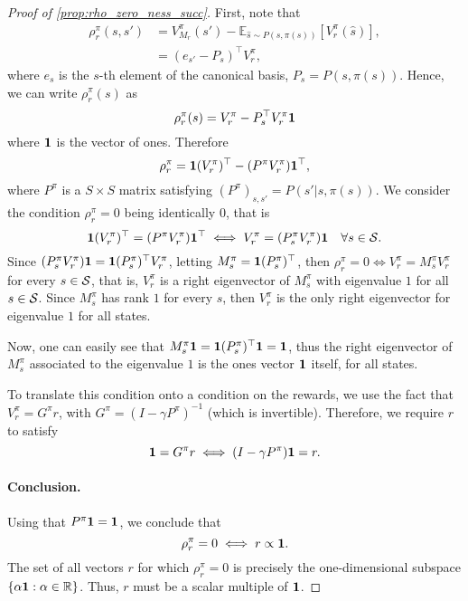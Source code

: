 \begin{proof}[Proof of \cref{prop:rho_zero_ness_succ}]
First, note that
    \begin{align*}
    \rho_r^\pi(s,s')&= V_{M_r}^\pi(s')- \mathbb{E}_{\hat s\sim P(s,\pi(s))}[V_{r}^\pi(\hat s)],\\
    &=  (e_{s'} - P_s )^\top V_{r}^\pi ,
\end{align*}
where $e_s$ is the $s$-th element of the canonical basis, $P_s=P(s,\pi(s))$. Hence, we can write $\rho_r^\pi(s)$ as
\[
\rho_r^\pi(s) = V_{r}^\pi - P_s^\top V_r^\pi {\bf 1}
\]
where ${\bf 1}$ is the vector of ones. Therefore
\[
\rho_r^\pi = {\bf 1}(V_r^\pi)^\top - (P^\pi V_r^\pi){\bf 1}^\top,
\]
where $P^\pi$ is a $S\times S$ matrix satisfying $(P^\pi)_{s,s'}=P(s'|s,\pi(s))$.
 We consider the condition $\rho_r^\pi=0$ being identically $0$, that is
\[
{\bf 1}(V_r^\pi)^\top = (P^\pi V_r^\pi){\bf 1}^\top \iff V_r^\pi = (P_s^\pi V_r^\pi) {\bf 1} \quad \forall s\in {\cal S}.
\]
Since $(P_s^\pi V_r^\pi) {\bf 1} = {\bf 1}(P_s^\pi)^\top V_r^\pi$, letting $M_s^\pi= {\bf 1}(P_s^\pi)^\top $, then $\rho_r^\pi = 0 \iff V_r^\pi = M_s^\pi V_r^\pi$ for every $s\in{\cal S}$, that is, $V_r^\pi$ is a right eigenvector of $M_s^\pi$ with eigenvalue $1$ for all $s\in{\cal S}$. Since $M_s^\pi$ has rank $1$ for every $s$, then $V_r^\pi$ is the only right eigenvector for eigenvalue $1$ for all states.

Now, one can easily see that $M_s^\pi {\bf 1}= {\bf 1}(P_s^\pi)^\top {\bf 1}={\bf 1}$, thus the right eigenvector of $M_s^\pi$ associated to the eigenvalue $1$ is the ones vector ${\bf 1}$ itself, for all states.


To translate this condition onto a condition on the rewards, we use the fact that  $V_r^\pi=G^\pi r$, with $G^\pi=(I-\gamma P^\pi)^{-1}$ (which is invertible). Therefore, we require $r$ to satisfy
\[
{\bf 1}=  G^\pi r \iff (I-\gamma P^\pi) {\bf 1}=r.
\]





\paragraph{Conclusion.}
Using that $P^\pi{\bf 1}={\bf 1}$, we conclude  that
\[
\rho_r^\pi = 0 \iff r \propto  {\bf 1}.
\]
The set of all vectors $r$ for which $\rho_r^\pi=0$ is precisely the one-dimensional subspace $\{\alpha {\bf 1} : \alpha \in \mathbb{R}\}$. Thus, $r$ must be a scalar multiple of ${\bf 1}$.
\end{proof}



